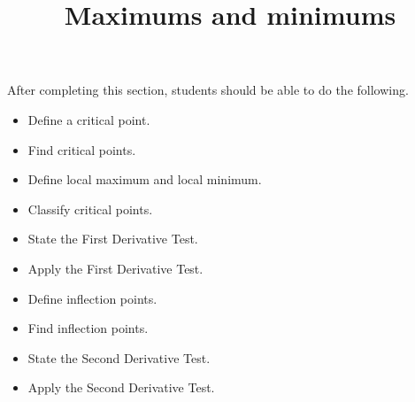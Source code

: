 \documentclass{ximera}
\title{Maximums and minimums}
\begin{document}
\begin{abstract}
\end{abstract}

\maketitle

\begin{sectionOutcomes}

After completing this section, students should be able to do the following.

\begin{itemize}
	\item Define a critical point.
	\item Find critical points.
	\item Define local maximum and local minimum.
	\item Classify critical points.
	\item State the First Derivative Test.
	\item Apply the First Derivative Test.
	\item Define inflection points.
	\item Find inflection points.
	\item State the Second Derivative Test.
	\item Apply the Second Derivative Test.
	
\end{itemize}

\end{sectionOutcomes}
\end{document}
